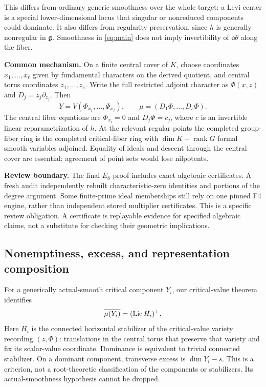 This differs from ordinary generic smoothness over the whole target: a Levi center is a special lower-dimensional locus that singular or nonreduced components could dominate. It also differs from regularity preservation, since $h$ is generally nonregular in $\mathfrak g$. Smoothness in \eqref{eq:main} does not imply invertibility of $\dd\theta$ along the fiber.

\textbf{Common mechanism.} On a finite central cover of $K$, choose coordinates $x_1,\ldots,x_\ell$ given by fundamental characters on the derived quotient, and central torus coordinates $z_1,\ldots,z_s$. Write the full restricted adjoint character as $\Phi(x,z)$ and $D_j=z_j\partial_{z_j}$. Then
\[
Y=V(\Phi_{x_1},\ldots,\Phi_{x_\ell}),\qquad
\mu=(D_1\Phi,\ldots,D_s\Phi).
\]
The central fiber equations are $\Phi_{x_i}=0$ and $D_j\Phi=c_j$, where $c$ is an invertible linear reparametrization of $h$. At the relevant regular points the completed group-fiber ring is the completed critical-fiber ring with $\dim K-\operatorname{rank}G$ formal smooth variables adjoined. Equality of ideals and descent through the central cover are essential; agreement of point sets would lose nilpotents.

\textbf{Review boundary.} The final $E_8$ proof includes exact algebraic certificates. A fresh audit independently rebuilt characteristic-zero identities and portions of the degree argument. Some finite-prime ideal memberships still rely on one pinned F4 engine, rather than independent stored multiplier certificates. This is a specific review obligation. A certificate is replayable evidence for specified algebraic claims, not a substitute for checking their geometric implications.

\subsection{Nonemptiness, excess, and representation composition}

For a generically actual-smooth critical component $Y_i$, our critical-value theorem identifies
\[
\overline{\mu(Y_i)}=(\operatorname{Lie} H_i)^\perp.
\]
Here $H_i$ is the connected horizontal stabilizer of the critical-value variety recording $(z,\Phi)$: translations in the central torus that preserve that variety and fix its scalar-value coordinate. Dominance is equivalent to trivial connected stabilizer. On a dominant component, transverse excess is $\dim Y_i-s$. This is a criterion, not a root-theoretic classification of the components or stabilizers. Its actual-smoothness hypothesis cannot be dropped.

